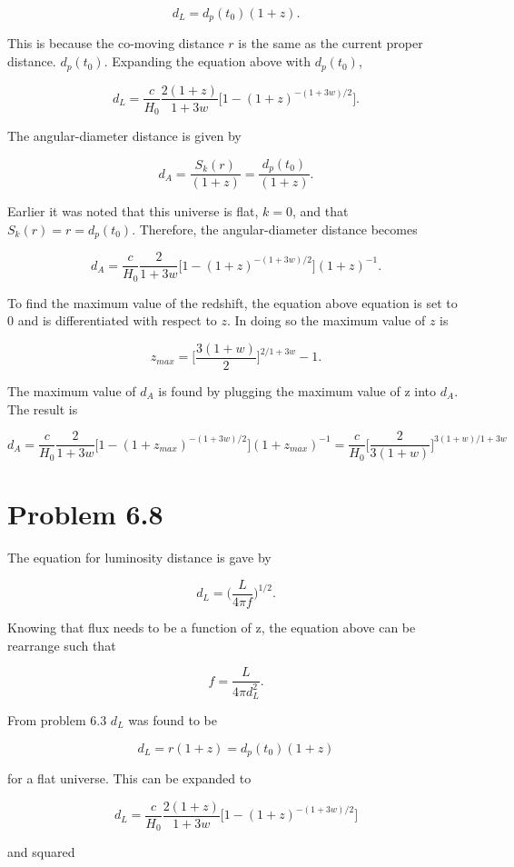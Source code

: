 \documentclass[12pt]{article}
\begin{document}
$$
d_{L} = d_{p}(t_{0})(1 + z).
$$

This is because the co-moving distance $r$ is the same as the current proper distance. $d_{p}(t_{0})$. Expanding the equation above with $d_{p}(t_{0})$,

$$
d_{L} = \frac{c}{H_{0}}\frac{2(1 + z)}{1 + 3w}\Big[1 - (1 + z)^{-(1 + 3w)/2}\Big].
$$

The angular-diameter distance is given by

$$
d_{A} = \frac{S_{k}(r)}{(1 + z)} = \frac{d_{p}(t_{0})}{(1 + z)}.
$$

Earlier it was noted that this universe is flat, $k = 0$, and that $S_{k}(r) = r = d_{p}(t_{0})$. Therefore, the angular-diameter distance becomes

$$
d_{A} = \frac{c}{H_{0}}\frac{2}{1 + 3w}\Big[1 - (1 + z)^{-(1 + 3w)/2}\Big] (1 + z)^{-1}.
$$

To find the maximum value of the redshift, the equation above equation is set to $0$ and is differentiated with respect to $z$. In doing so the maximum value of $z$ is

$$
z_{max} = \Big[\frac{3(1 + w)}{2} \Big]^{2/1 + 3w} - 1.
$$

The maximum value of $d_{A}$ is found by plugging the maximum value of z into $d_{A}$. The result is

$$
d_{A} = \frac{c}{H_{0}}\frac{2}{1 + 3w}\Big[1 - (1 + z_{max})^{-(1 + 3w)/2}\Big] (1 + z_{max})^{-1} = \frac{c}{H_{0}}\Big[\frac{2}{3(1 + w)}\Big]^{3(1 + w)/1 + 3w}
$$

\section*{Problem 6.8}

The equation for luminosity distance is gave by 

$$
d_{L} = \Big(\frac{L}{4\pi f}\Big)^{1/2}.
$$

Knowing that flux needs to be a function of z, the equation above can be rearrange such that 

$$
f = \frac{L}{4\pi d_{L}^{2}}.
$$

From problem 6.3 $d_{L}$ was found to be 

$$
d_{L} = r(1 + z) = d_{p}(t_{0})(1 + z)
$$

for a flat universe. This can be expanded to 

$$
d_{L} = \frac{c}{H_{0}}\frac{2(1 + z)}{1 + 3w}\Big[1 - (1 + z)^{-(1 + 3w)/2}\Big]
$$

and squared 
\end{document}
